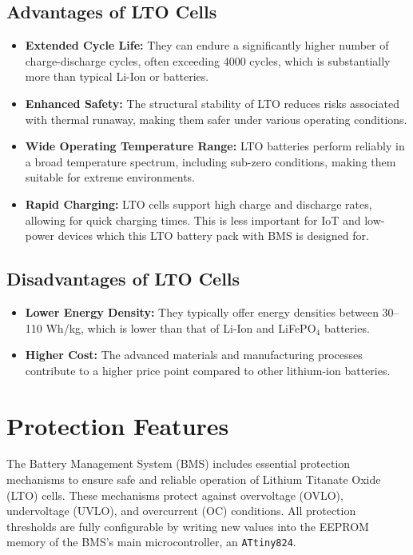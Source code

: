 \documentclass[11pt]{datasheet}
\begin{document}
\subsection{Advantages of LTO Cells}

\begin{itemize}
\item \textbf{Extended Cycle Life:} They can endure a significantly higher number of charge-discharge cycles, often exceeding 4000 cycles, which is substantially more than typical Li-Ion or  batteries.
\item \textbf{Enhanced Safety:} The structural stability of LTO reduces risks associated with thermal runaway, making them safer under various operating conditions.
\item \textbf{Wide Operating Temperature Range:} LTO batteries perform reliably in a broad temperature spectrum, including sub-zero conditions, making them suitable for extreme environments.
\item \textbf{Rapid Charging:} LTO cells support high charge and discharge rates, allowing for quick charging times. This is less important for IoT and low-power devices which this LTO battery pack with BMS is designed for.
\end{itemize}

\subsection{Disadvantages of LTO Cells}

\begin{itemize}
\item \textbf{Lower Energy Density:} They typically offer energy densities between 30–110 Wh/kg, which is lower than that of Li-Ion and LiFePO$_4$ batteries.
\item \textbf{Higher Cost:} The advanced materials and manufacturing processes contribute to a higher price point compared to other lithium-ion batteries.
\end{itemize}

\section{Protection Features}

The Battery Management System (BMS) includes essential protection mechanisms to
ensure safe and reliable operation of Lithium Titanate Oxide (LTO) cells. These
mechanisms protect against overvoltage (OVLO), undervoltage (UVLO), and
overcurrent (OC) conditions. All protection thresholds are fully configurable
by writing new values into the EEPROM memory of the BMS's main microcontroller,
an \texttt{ATtiny824}.
\end{document}
